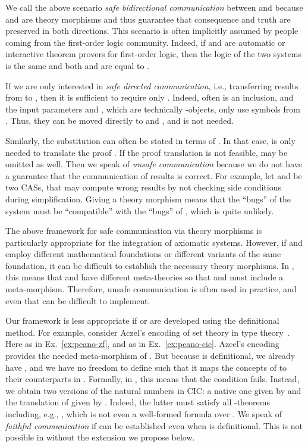 We call the above scenario \emph{safe bidirectional communication} between  and  because  and  are theory morphisms and thus guarantee that consequence and truth are preserved in both directions.
This scenario is often implicitly assumed by people coming from the first-order logic community. Indeed, if  and  are automatic or interactive theorem provers for first-order logic, then the logic of the two systems is the same and both  and  are equal to .

If we are only interested in \emph{safe directed communication}, i.e., transferring results from  to , then it is sufficient to require only . Indeed, often  is an inclusion, and the input parameters  and , which are technically -objects, only use symbols from . Thus, they can be moved directly to  and , and  is not needed.


Similarly, the substitution  can often be stated in terms of . In that case,  is only needed to translate the proof . If the proof translation is not feasible,  may be omitted as well.
Then we speak of \emph{unsafe communication} because we do not have a guarantee that the communication of results is correct.
For example, let  and  be two CASs, that may compute wrong results by not
checking side conditions during simplification. Giving a theory morphism  means that
the ``bugs'' of the system  must be ``compatible'' with the ``bugs'' of ,
which is quite unlikely.


The above framework for safe communication via theory morphisms is particularly appropriate for the integration of axiomatic systems. However, if  and  employ different mathematical foundations or different variants of the same foundation, it can be difficult to establish the necessary theory morphisms. In {\MMT}, this means that  and  have different meta-theories so that  and  must include a meta-morphism. Therefore, unsafe communication is often used in practice, and even that can be difficult to implement.

Our framework is less appropriate if  or  are developed using the
definitional method. For example, consider Aczel's encoding of set theory in type
theory~\cite{aczel,werner-zfc}. Here  as in Ex.~\ref{ex:peano-zf}, and
 as in Ex.~\ref{ex:peano-cic}. Azcel's encoding provides the
needed meta-morphism  of . But because  is definitional, we
already have , and we have no freedom to define  such that it maps the concepts of
 to their counterparts in .  Formally, in {\MMT}, this means that the
condition  fails. Instead, we obtain two versions of the natural
numbers in CIC: a native one given by  and the translation of  given by
. Indeed, the latter must satisfy all -theorems including, e.g.,
, which is not even a well-formed formula over . We speak of
\emph{faithful communication} if  can be established even when
 is definitional. This is not possible in {\MMT} without the extension we propose
below.







